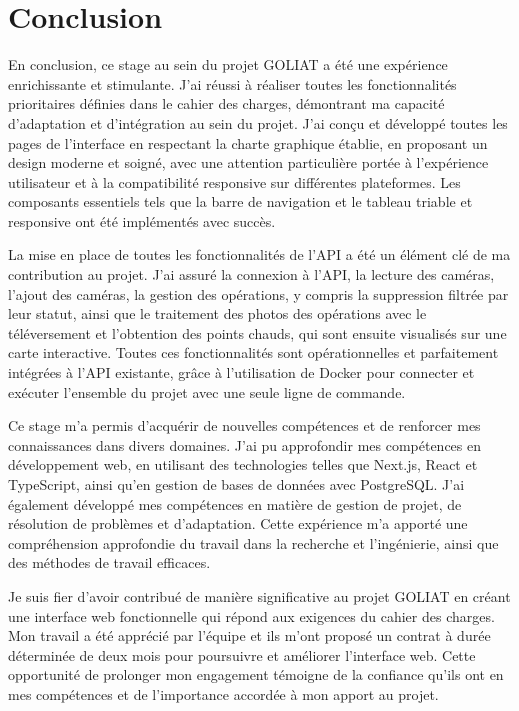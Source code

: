 \chapter{Conclusion}
En conclusion, ce stage au sein du projet GOLIAT a été une expérience enrichissante et stimulante. J'ai réussi à réaliser toutes les fonctionnalités prioritaires définies dans le cahier des charges, démontrant ma capacité d'adaptation et d'intégration au sein du projet. J'ai conçu et développé toutes les pages de l'interface en respectant la charte graphique établie, en proposant un design moderne et soigné, avec une attention particulière portée à l'expérience utilisateur et à la compatibilité responsive sur différentes plateformes. Les composants essentiels tels que la barre de navigation et le tableau triable et responsive ont été implémentés avec succès.

La mise en place de toutes les fonctionnalités de l'API a été un élément clé de ma contribution au projet. J'ai assuré la connexion à l'API, la lecture des caméras, l'ajout des caméras, la gestion des opérations, y compris la suppression filtrée par leur statut, ainsi que le traitement des photos des opérations avec le téléversement et l'obtention des points chauds, qui sont ensuite visualisés sur une carte interactive. Toutes ces fonctionnalités sont opérationnelles et parfaitement intégrées à l'API existante, grâce à l'utilisation de Docker pour connecter et exécuter l'ensemble du projet avec une seule ligne de commande.

Ce stage m'a permis d'acquérir de nouvelles compétences et de renforcer mes connaissances dans divers domaines. J'ai pu approfondir mes compétences en développement web, en utilisant des technologies telles que Next.js, React et TypeScript, ainsi qu'en gestion de bases de données avec PostgreSQL. J'ai également développé mes compétences en matière de gestion de projet, de résolution de problèmes et d'adaptation.
Cette expérience m'a apporté une compréhension approfondie du travail dans la recherche et l'ingénierie, ainsi que des méthodes de travail efficaces.

Je suis fier d'avoir contribué de manière significative au projet GOLIAT en créant une interface web fonctionnelle qui répond aux exigences du cahier des charges. Mon travail a été apprécié par l'équipe et ils m'ont proposé un contrat à durée déterminée de deux mois pour poursuivre et améliorer l'interface web. Cette opportunité de prolonger mon engagement témoigne de la confiance qu'ils ont en mes compétences et de l'importance accordée à mon apport au projet.

